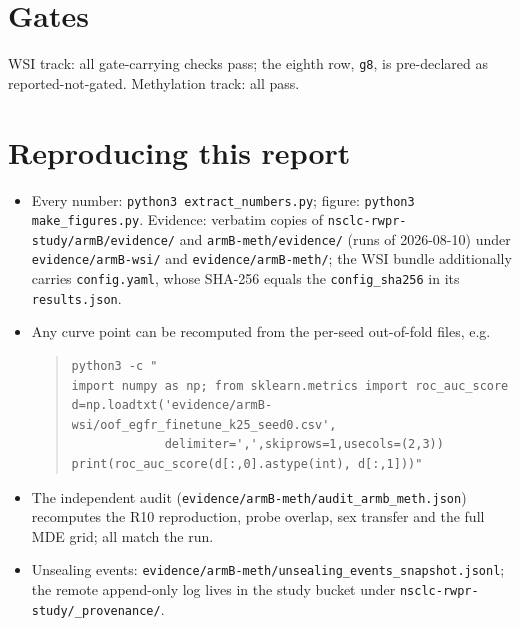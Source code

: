 \documentclass[11pt,a4paper]{article}
\begin{document}
\section{Gates}

WSI track: all \RNGatesWsiPass{} gate-carrying checks pass; the eighth row, \texttt{g8}, is
pre-declared as reported-not-gated. Methylation track: all \RNGatesMeth{} pass.

\begin{center}
\small

\end{center}

\begin{center}
\small

\end{center}

\section{Reproducing this report}

\begin{itemize}[leftmargin=1.2em,itemsep=1pt]
\item Every number: \texttt{python3 extract\_numbers.py}; figure:
\texttt{python3 make\_figures.py}. Evidence: verbatim copies of
\texttt{nsclc-rwpr-study/armB/evidence/} and \texttt{armB-meth/evidence/} (runs of
2026-08-10) under \texttt{evidence/armB-wsi/} and \texttt{evidence/armB-meth/}; the WSI
bundle additionally carries \texttt{config.yaml}, whose SHA-256 equals the
\texttt{config\_sha256} in its \texttt{results.json}.
\item Any curve point can be recomputed from the per-seed out-of-fold files, e.g.
\begin{quote}\small\begin{verbatim}
python3 -c "
import numpy as np; from sklearn.metrics import roc_auc_score
d=np.loadtxt('evidence/armB-wsi/oof_egfr_finetune_k25_seed0.csv',
             delimiter=',',skiprows=1,usecols=(2,3))
print(roc_auc_score(d[:,0].astype(int), d[:,1]))"
\end{verbatim}\end{quote}
\item The independent audit (\texttt{evidence/armB-meth/audit\_armb\_meth.json}) recomputes
the R10 reproduction, probe overlap, sex transfer and the full MDE grid; all match the run.
\item Unsealing events: \texttt{evidence/armB-meth/unsealing\_events\_snapshot.jsonl};
the remote append-only log lives in the study bucket under
\texttt{nsclc-rwpr-study/}\allowbreak\texttt{\_provenance/}.
\end{itemize}
\end{document}
